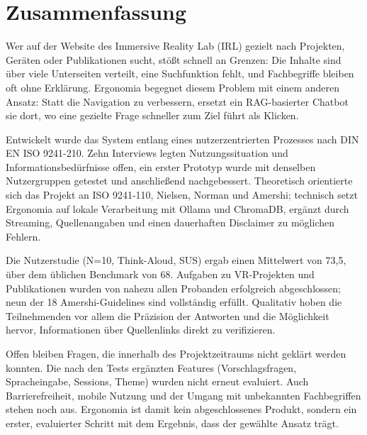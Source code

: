 \section*{Zusammenfassung}

Wer auf der Website des Immersive Reality Lab (IRL) gezielt nach Projekten, Geräten oder Publikationen sucht, stößt schnell an Grenzen: Die Inhalte sind über viele Unterseiten verteilt, eine Suchfunktion fehlt, und Fachbegriffe bleiben oft ohne Erklärung. Ergonomia begegnet diesem Problem mit einem anderen Ansatz: Statt die Navigation zu verbessern, ersetzt ein RAG-basierter Chatbot sie dort, wo eine gezielte Frage schneller zum Ziel führt als Klicken.

Entwickelt wurde das System entlang eines nutzerzentrierten Prozesses nach DIN EN ISO 9241-210. Zehn Interviews legten Nutzungssituation und Informationsbedürfnisse offen, ein erster Prototyp wurde mit denselben Nutzergruppen getestet und anschließend nachgebessert. Theoretisch orientierte sich das Projekt an ISO 9241-110, Nielsen, Norman und Amershi; technisch setzt Ergonomia auf lokale Verarbeitung mit Ollama und ChromaDB, ergänzt durch Streaming, Quellenangaben und einen dauerhaften Disclaimer zu möglichen Fehlern.

Die Nutzerstudie (N=10, Think-Aloud, SUS) ergab einen Mittelwert von 73{,}5, über dem üblichen Benchmark von 68. Aufgaben zu VR-Projekten und Publikationen wurden von nahezu allen Probanden erfolgreich abgeschlossen; neun der 18 Amershi-Guidelines sind vollständig erfüllt. Qualitativ hoben die Teilnehmenden vor allem die Präzision der Antworten und die Möglichkeit hervor, Informationen über Quellenlinks direkt zu verifizieren.

Offen bleiben Fragen, die innerhalb des Projektzeitraums nicht geklärt werden konnten. Die nach den Tests ergänzten Features (Vorschlagsfragen, Spracheingabe, Sessions, Theme) wurden nicht erneut evaluiert. Auch Barrierefreiheit, mobile Nutzung und der Umgang mit unbekannten Fachbegriffen stehen noch aus. Ergonomia ist damit kein abgeschlossenes Produkt, sondern ein erster, evaluierter Schritt mit dem Ergebnis, dass der gewählte Ansatz trägt.
